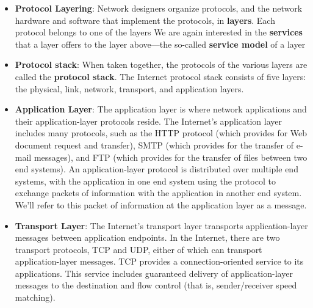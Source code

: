 \documentclass{report}
\begin{document}
\begin{itemize}
            \begin{itemize}
                \item \textbf{Modularity:} Breaking tasks apart makes it easier to design, build, and test network systems.
                \item \textbf{Independence:} If you change how one layer works, it does not affect the other layers as long as the inputs and outputs stay the same.
                \item \textbf{Interoperability:} Hardware and software from different makers can work together seamlessly because they follow the same layer rules.
                \item \textbf{Easy Troubleshooting:} When a network breaks, technicians can test specific layers to find the exact source of the problem
            \end{itemize}
        \item \textbf{Protocol Layering}: Network designers organize protocols, and the network hardware and software that implement the protocols, in \textbf{layers}. Each protocol belongs to one of the layers
            \bigbreak \noindent 
            We are again interested in the \textbf{services} that a layer offers to the layer above—the so-called \textbf{service model} of a layer
        \item \textbf{Protocol stack}: When taken together, the protocols of the various layers are called the \textbf{protocol stack}. The Internet protocol stack consists of five layers: the physical, link, network, transport, and application layers.
        \item \textbf{Application Layer}: The application layer is where network applications and their application-layer protocols reside. The Internet’s application layer includes many protocols, such as the HTTP protocol (which provides for Web document request and transfer), SMTP (which provides for the transfer of e-mail messages), and FTP (which provides for the transfer of files between two end systems).
            \bigbreak \noindent 
            An application-layer protocol is distributed over multiple end systems, with the application in one end system using the protocol to exchange packets of information with the application in another end system. We’ll refer to this packet of information at the application layer as a message.
        \item \textbf{Transport Layer}: The Internet’s transport layer transports application-layer messages between application endpoints. In the Internet, there are two transport protocols, TCP and UDP, either of which can transport application-layer messages. TCP provides a connection-oriented service to its applications. This service includes guaranteed delivery of application-layer messages to the destination and flow control (that is, sender/receiver speed matching).

\end{itemize}
\end{document}
